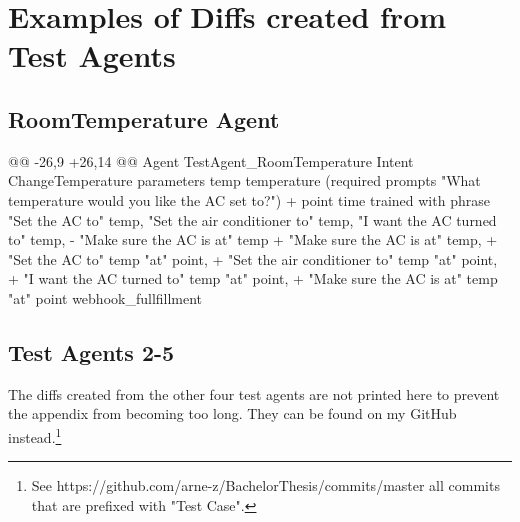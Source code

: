 \chapter{Examples of Diffs created from Test Agents}

\section{RoomTemperature Agent}
\label{RoomTemperature Agent DSLDiff}

\begin{DSL}
  @@ -26,9 +26,14 @@ Agent TestAgent_RoomTemperature
     Intent ChangeTemperature
       parameters 
         temp temperature (required prompts "What temperature 
           would you like the AC set to?")
  +      point time
       trained with phrase 
         "Set the AC to" temp, 
         "Set the air conditioner to" temp, 
         "I want the AC turned to" temp, 
  -      "Make sure the AC is at" temp
  +      "Make sure the AC is at" temp,
  +      "Set the AC to" temp "at" point, 
  +      "Set the air conditioner to" temp "at" point,
  +      "I want the AC turned to" temp "at" point,
  +      "Make sure the AC is at" temp "at" point
       webhook_fullfillment
\end{DSL}

\section{Test Agents 2-5}
The diffs created from the other four test agents are not printed here to prevent the appendix from becoming too long. They can be found on my GitHub instead.\footnote{See https://github.com/arne-z/BachelorThesis/commits/master all commits that are prefixed with "Test Case".}